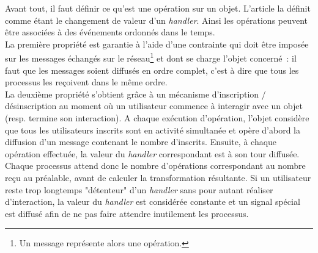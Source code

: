 \documentclass[11pt]{article}
\begin{document}
Avant tout, il faut définir ce qu'est une opération sur un objet. L'article \cite{margery} la définit comme étant le changement de valeur d'un \textit{handler}. Ainsi les opérations peuvent être associées à des événements ordonnés dans le temps.
\\

La première propriété est garantie à l'aide d'une contrainte qui doit être imposée sur les messages échangés sur le réseau\footnote{Un message représente alors une opération.} et dont se charge l'objet concerné~: il faut que les messages soient diffusés en ordre complet, c'est à dire que tous les processus les reçoivent dans le même ordre.
\\

La deuxième propriété s'obtient grâce à un mécanisme d'inscription / désinscription au moment où un utilisateur commence à interagir avec un objet (resp. termine son interaction). A chaque exécution d'opération, l'objet considère que tous les utilisateurs inscrits sont en activité simultanée et opère d'abord la diffusion d'un message contenant le nombre d'inscrits. Ensuite, à chaque opération effectuée, la valeur du \textit{handler} correspondant est à son tour diffusée. Chaque processus attend donc le nombre d'opérations correspondant au nombre reçu au préalable, avant de calculer la transformation résultante. Si un utilisateur reste trop longtemps "détenteur" d'un \textit{handler} sans pour autant réaliser d'interaction, la valeur du \textit{handler} est considérée constante et un signal spécial est diffusé afin de ne pas faire attendre inutilement les processus.
\end{document}
